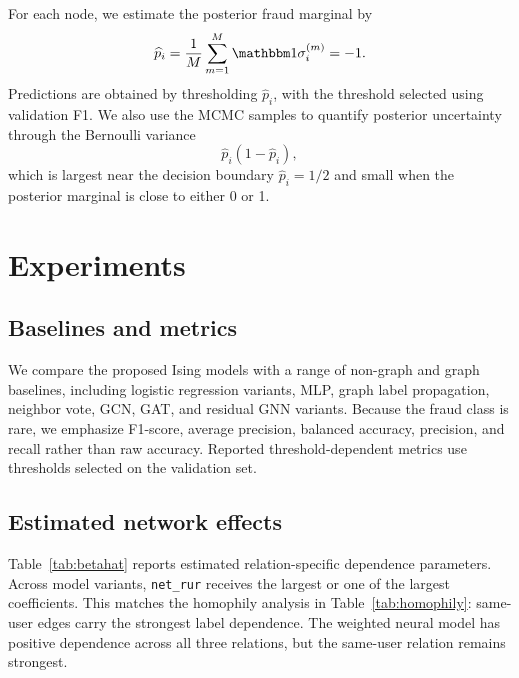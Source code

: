 \documentclass[twoside]{article}
\newcommand{\ind}{\mathbbm 1}
\newcommand{\netrur}{\texttt{net\_rur}}
\begin{document}
For each node, we estimate the posterior fraud marginal by
\begin{equation}
\label{eq:marginal}
\widehat p_i
= \frac{1}{M}\sum_{m=1}^{M}\ind{\sigma_i^{(m)}=-1}.
\end{equation}
Predictions are obtained by thresholding $\widehat p_i$, with the threshold selected using validation F1. We also use the MCMC samples to quantify posterior uncertainty through the Bernoulli variance
\begin{equation}
\label{eq:variance}
\widehat p_i(1-\widehat p_i),
\end{equation}
which is largest near the decision boundary $\widehat p_i=1/2$ and small when the posterior marginal is close to either 0 or 1.


\section{Experiments}

\subsection{Baselines and metrics}

We compare the proposed Ising models with a range of non-graph and graph baselines, including logistic regression variants, MLP, graph label propagation, neighbor vote, GCN, GAT, and residual GNN variants. Because the fraud class is rare, we emphasize F1-score, average precision, balanced accuracy, precision, and recall rather than raw accuracy. Reported threshold-dependent metrics use thresholds selected on the validation set.



\subsection{Estimated network effects}

Table~\ref{tab:betahat} reports estimated relation-specific dependence parameters. Across model variants, \netrur{} receives the largest or one of the largest coefficients. This matches the homophily analysis in Table~\ref{tab:homophily}: same-user edges carry the strongest label dependence. The weighted neural model has positive dependence across all three relations, but the same-user relation remains strongest.
\end{document}
